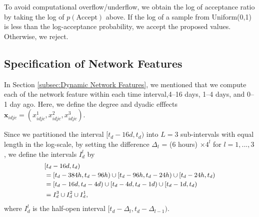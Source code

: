\documentclass[twoside]{article}
\begin{document}
    To avoid computational overflow/underflow, we obtain the log of acceptance ratio by taking the log of $p(\mbox{Accept})$ above. If the log of a sample from Uniform(0,1) is less than the log-acceptance probability, we accept the proposed values. Otherwise, we reject.
    
    \subsection{Specification of Network Features}\label{subsec:Specification of Network Features}
    In Section \ref{subsec:Dynamic Network Features}, we mentioned that we compute each of the network feature within each time interval,4--16 days, 1--4 days, and 0--1 day ago. Here, we define the degree and dyadic efffects $\boldsymbol{x}_{idjc} = ({x}^1_{idjc}, {x}^2_{idjc}, {x}^3_{idjc})$.
    
    Since we partitioned the interval $[t_d-16d, t_d)$ into $L=3$ sub-intervals with equal length in the log-scale, by setting the difference $\Delta_l$ = (6 hours) $\times  4^l$ for $l=1,...,3$, we define the intervals $I_d^l$ by 
    \begin{equation*}
    \footnotesize
    \begin{aligned}
    &[t_d-16d,t_d) \\&=[t_d-384h, t_d-96h) \cup [t_d-96h, t_d-24h)\cup [t_d-24h, t_d) \\&= [t_d-16d, t_d-4d) \cup [t_d-4d, t_d-1d)\cup [t_d-1d, t_d)
    \\&=I_d^{3}\cup  I_d^{2}\cup I_d^{1},
    \end{aligned}
    \end{equation*}
    where $I_{d}^{l} $ is the half-open interval $[t_d-\Delta_l, t_d-\Delta_{l-1})$. 
    
\end{document}
